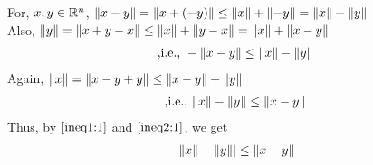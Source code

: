 \begin{soln}{1}
  For, $x, y \in \mathbb{R}^n$, $\norm{x-y} = \norm{x + (-y)} \leq \norm{x} + \norm{-y} = \norm{x} + \norm{y}$ \\
  Also, $\norm{y} = \norm{x+y-x} \leq \norm{x}+\norm{y-x}=\norm{x}+\norm{x-y}$
  \begin{align}\label{ineq1:1}
    \text{,i.e., } -\norm{x-y} \leq \norm{x}-\norm{y}
  \end{align}
  Again, $\norm{x} = \norm{x-y+y} \leq \norm{x-y}+\norm{y}$
  \begin{align}\label{ineq2:1}
    \text{,i.e., } \norm{x}-\norm{y} \leq \norm{x-y}
  \end{align}
  Thus, by $ \ref{ineq1:1} $ and $ \ref{ineq2:1} $, we get 
  \begin{align}\label{ineq3:1}
    \left| {\norm{x}-\norm{y}} \right| \leq \norm{x-y}
  \end{align}
\end{soln}
